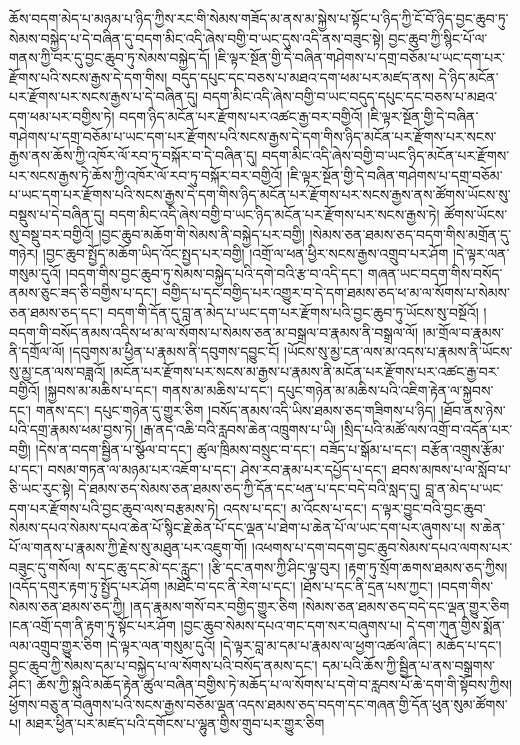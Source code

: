 ཆོས་བདག་མེད་པ་མཉམ་པ་ཉིད་ཀྱིས་རང་གི་སེམས་གཟོད་མ་ནས་མ་སྐྱེས་པ་སྟོང་པ་ཉིད་ཀྱི་ངོ་བོ་ཉིད་བྱང་ཆུབ་ཏུ་སེམས་བསྐྱེད་པ་དེ་བཞིན་དུ་བདག་མིང་འདི་ཞེས་བགྱི་བ་ཡང་དུས་འདི་ནས་བཟུང་སྟེ། བྱང་ཆུབ་ཀྱི་སྙིང་པོ་ལ་གནས་ཀྱི་བར་དུ་བྱང་ཆུབ་ཏུ་སེམས་བསྐྱེད་དོ། །ཇི་ལྟར་སྔོན་གྱི་དེ་བཞིན་གཤེགས་པ་དགྲ་བཅོམ་པ་ཡང་དག་པར་རྫོགས་པའི་སངས་རྒྱས་དེ་དག་གིས། བདུད་དཔུང་དང་བཅས་པ་མཐའ་དག་ཕམ་པར་མཛད་ནས། དེ་ཉིད་མངོན་པར་རྫོགས་པར་སངས་རྒྱས་པ་དེ་བཞིན་དུ། བདག་མིང་འདི་ཞེས་བགྱི་བ་ཡང་བདུད་དཔུང་དང་བཅས་པ་མཐའ་དག་ཕམ་པར་བགྱིས་ཏེ། བདག་ཉིད་མངོན་པར་རྫོགས་པར་འཚང་རྒྱ་བར་བགྱིའོ། །ཇི་ལྟར་སྔོན་གྱི་དེ་བཞིན་གཤེགས་པ་དགྲ་བཅོམ་པ་ཡང་དག་པར་རྫོགས་པའི་སངས་རྒྱས་དེ་དག་གིས་ཉིད་མངོན་པར་རྫོགས་པར་སངས་རྒྱས་ནས་ཆོས་ཀྱི་འཁོར་ལོ་རབ་ཏུ་བསྐོར་བ་དེ་བཞིན་དུ། བདག་མིང་འདི་ཞེས་བགྱི་བ་ཡང་ཉིད་མངོན་པར་རྫོགས་པར་སངས་རྒྱས་ཏེ་ཆོས་ཀྱི་འཁོར་ལོ་རབ་ཏུ་བསྐོར་བར་བགྱིའོ། །ཇི་ལྟར་སྔོན་གྱི་དེ་བཞིན་གཤེགས་པ་དགྲ་བཅོམ་པ་ཡང་དག་པར་རྫོགས་པའི་སངས་རྒྱས་དེ་དག་གིས་ཉིད་མངོན་པར་རྫོགས་པར་སངས་རྒྱས་ནས་ཚོགས་ཡོངས་སུ་བསྡུས་པ་དེ་བཞིན་དུ། བདག་མིང་འདི་ཞེས་བགྱི་བ་ཡང་ཉིད་མངོན་པར་རྫོགས་པར་སངས་རྒྱས་ཏེ། ཚོགས་ཡོངས་སུ་བསྡུ་བར་བགྱིའོ། །བྱང་ཆུབ་མཆོག་གི་སེམས་ནི་བསྐྱེད་པར་བགྱི། །སེམས་ཅན་ཐམས་ཅད་བདག་གིས་མགྲོན་དུ་གཉེར། །བྱང་ཆུབ་སྤྱོད་མཆོག་ཡིད་འོང་སྤྱད་པར་བགྱི། །འགྲོ་ལ་ཕན་ཕྱིར་སངས་རྒྱས་འགྲུབ་པར་ཤོག །དེ་ལྟར་ལན་གསུམ་དུའོ། །བདག་གིས་བྱང་ཆུབ་ཏུ་སེམས་བསྐྱེད་པའི་དགེ་བའི་རྩ་བ་འདི་དང་། གཞན་ཡང་བདག་གིས་བསོད་ནམས་ཅུང་ཟད་ཅི་བགྱིས་པ་དང་། བགྱིད་པ་དང་བགྱིད་པར་འགྱུར་བ་དེ་དག་ཐམས་ཅད་ཕ་མ་ལ་སོགས་པ་སེམས་ཅན་ཐམས་ཅད་དང་། བདག་གི་དོན་དུ་བླ་ན་མེད་པ་ཡང་དག་པར་རྫོགས་པའི་བྱང་ཆུབ་ཏུ་ཡོངས་སུ་བསྔོའོ། །བདག་གི་བསོད་ནམས་འདིས་ཕ་མ་ལ་སོགས་པ་སེམས་ཅན་མ་བསྒྲལ་བ་རྣམས་ནི་བསྒྲལ་ལོ། །མ་གྲོལ་བ་རྣམས་ནི་དགྲོལ་ལོ། །དབུགས་མ་ཕྱིན་པ་རྣམས་ནི་དབུགས་དབྱུང་ངོ། །ཡོངས་སུ་མྱ་ངན་ལས་མ་འདས་པ་རྣམས་ནི་ཡོངས་སུ་མྱ་ངན་ལས་བཟླའོ། །མངོན་པར་རྫོགས་པར་སངས་མ་རྒྱས་པ་རྣམས་ནི་མངོན་པར་རྫོགས་པར་འཚང་རྒྱ་བར་བགྱིའོ། །སྐྱབས་མ་མཆིས་པ་དང་། གནས་མ་མཆིས་པ་དང་། དཔུང་གཉེན་མ་མཆིས་པའི་འཇིག་རྟེན་ལ་སྐྱབས་དང་། གནས་དང་། དཔུང་གཉེན་དུ་གྱུར་ཅིག །བསོད་ནམས་འདི་ཡིས་ཐམས་ཅད་གཟིགས་པ་ཉིད། །ཐོབ་ནས་ཉེས་པའི་དགྲ་རྣམས་ཕམ་བྱས་ཏེ། །རྒ་ནད་འཆི་བའི་རླབས་ཆེན་འཁྲུགས་པ་ཡི། །སྲིད་པའི་མཚོ་ལས་འགྲོ་བ་འདོན་པར་བགྱི། །དེས་ན་བདག་སྦྱིན་པ་སྩོལ་བ་དང་། ཚུལ་ཁྲིམས་བསྲུང་བ་དང་། བཟོད་པ་སྒོམ་པ་དང་། བརྩོན་འགྲུས་རྩོམ་པ་དང་། བསམ་གཏན་ལ་མཉམ་པར་འཇོག་པ་དང་། ཤེས་རབ་རྣམ་པར་དཔྱོད་པ་དང་། ཐབས་མཁས་པ་ལ་སློབ་པ་ཅི་ཡང་རུང་སྟེ། དེ་ཐམས་ཅད་སེམས་ཅན་ཐམས་ཅད་ཀྱི་དོན་དང་ཕན་པ་དང་བདེ་བའི་སླད་དུ། བླ་ན་མེད་པ་ཡང་དག་པར་རྫོགས་པའི་བྱང་ཆུབ་ལས་བརྩམས་ཏེ། འདས་པ་དང་། མ་འོངས་པ་དང་། ད་ལྟར་བྱུང་བའི་བྱང་ཆུབ་སེམས་དཔའ་སེམས་དཔའ་ཆེན་པོ་སྙིང་རྗེ་ཆེན་པོ་དང་ལྡན་པ་ཐེག་པ་ཆེན་པོ་ལ་ཡང་དག་པར་ཞུགས་པ། ས་ཆེན་པོ་ལ་གནས་པ་རྣམས་ཀྱི་རྗེས་སུ་མཐུན་པར་འཇུག་གོ། །འཕགས་པ་དག་བདག་བྱང་ཆུབ་སེམས་དཔའ་ལགས་པར་བཟུང་དུ་གསོལ། ས་དང་ཆུ་དང་མེ་དང་རླུང་། །རྩི་དང་ནགས་ཀྱི་ཤིང་ལྟ་བུར། །རྟག་ཏུ་སྲོག་ཆགས་ཐམས་ཅད་ཀྱིས། །འདོད་དགུར་རྟག་ཏུ་སྤྱོད་པར་ཤོག །མཐོང་བ་དང་ནི་རེག་པ་དང་། །ཐོས་པ་དང་ནི་དྲན་པས་ཀྱང་། །བདག་གིས་སེམས་ཅན་ཐམས་ཅད་ཀྱི། །ནད་རྣམས་གསོ་བར་བགྱིད་གྱུར་ཅིག །སེམས་ཅན་ཐམས་ཅད་བདེ་དང་ལྡན་གྱུར་ཅིག །ངན་འགྲོ་དག་ནི་རྟག་ཏུ་སྟོང་པར་ཤོག །བྱང་ཆུབ་སེམས་དཔའ་གང་དག་སར་བཞུགས་པ། དེ་དག་ཀུན་གྱིས་སྨོན་ལམ་འགྲུབ་གྱུར་ཅིག །དེ་ལྟར་ལན་གསུམ་དུའོ། །དེ་ལྟར་བླ་མ་དམ་པ་རྣམས་ལ་ཕྱག་འཚལ་ཞིང་། མཆོད་པ་དང་། བྱང་ཆུབ་ཀྱི་སེམས་དམ་པ་བསྐྱེད་པ་ལ་སོགས་པའི་བསོད་ནམས་དང་། དམ་པའི་ཆོས་ཀྱི་སྦྱིན་པ་ནས་བསྒྲགས་ཤིང་། ཆོས་ཀྱི་སྐུའི་མཆོད་རྟེན་ཚུལ་བཞིན་བགྱིས་ཏེ་མཆོད་པ་ལ་སོགས་པ་དགེ་བ་རླབས་པོ་ཆེ་དག་གི་སྟོབས་ཀྱིས། ཕྱོགས་བཅུ་ན་བཞུགས་པའི་སངས་རྒྱས་བཅོམ་ལྡན་འདས་ཐམས་ཅད་བདག་དང་གཞན་གྱི་དོན་ཕུན་སུམ་ཚོགས་པ། མཐར་ཕྱིན་པར་མཛད་པའི་དགོངས་པ་ལྷུན་གྱིས་གྲུབ་པར་གྱུར་ཅིག 